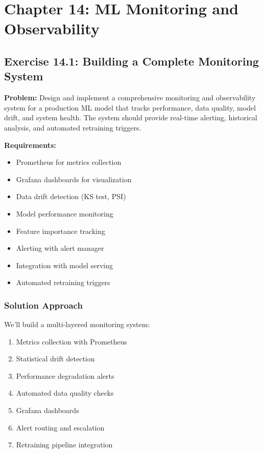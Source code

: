 \section{Chapter 14: ML Monitoring and Observability}

\subsection{Exercise 14.1: Building a Complete Monitoring System}

\textbf{Problem:} Design and implement a comprehensive monitoring and observability system for a production ML model that tracks performance, data quality, model drift, and system health. The system should provide real-time alerting, historical analysis, and automated retraining triggers.

\textbf{Requirements:}
\begin{itemize}
    \item Prometheus for metrics collection
    \item Grafana dashboards for visualization
    \item Data drift detection (KS test, PSI)
    \item Model performance monitoring
    \item Feature importance tracking
    \item Alerting with alert manager
    \item Integration with model serving
    \item Automated retraining triggers
\end{itemize}

\subsubsection{Solution Approach}

We'll build a multi-layered monitoring system:
\begin{enumerate}
    \item Metrics collection with Prometheus
    \item Statistical drift detection
    \item Performance degradation alerts
    \item Automated data quality checks
    \item Grafana dashboards
    \item Alert routing and escalation
    \item Retraining pipeline integration
\end{enumerate}

